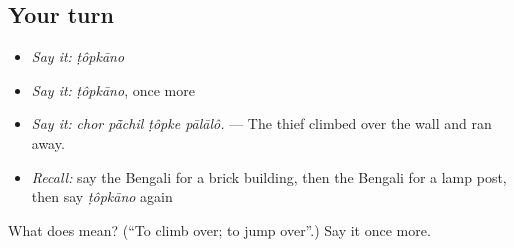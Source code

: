 \subsection*{Your turn}
\begin{itemize}
\raggedright
  \item \emph{Say it:} \emph{ṭôpkāno}
  \item \emph{Say it:} \emph{ṭôpkāno}, once more
  \item \emph{Say it:} \emph{chor pā̃chil ṭôpke pālālô.} — The thief climbed over the wall and ran away.
  \item \emph{Recall:} say the Bengali for a brick building, then the Bengali for a lamp post, then say \emph{ṭôpkāno} again
\end{itemize}

\begin{tcolorbox}[breakable,colback=teal!4,colframe=teal!35!black,title={Before you move on}]
What does  mean? (\textquotedblleft{}To climb over; to jump over\textquotedblright{}.) Say it once more.
\end{tcolorbox}
